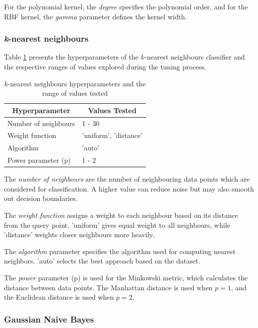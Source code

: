 For the polynomial kernel, the \textit{degree} specifies the polynomial order, and for the RBF kernel, the \textit{gamma} parameter defines the kernel width.

\subsubsection{\textit{k}-nearest neighbours}
Table \ref{tab:knn_params} presents the hyperparameters of the $k$-nearest neighbours classifier and the respective ranges of values explored during the tuning process.

\begin{table}[h]
	\centering
	\begin{tabular}{ll}
		\toprule
		\multicolumn{1}{c}{\textbf{Hyperparameter}} & \multicolumn{1}{c}{\textbf{Values Tested}} \\
		\midrule
		Number of neighbours			   & 1 - 30 \\
		Weight function			           & 'uniform', 'distance' \\
		Algorithm                          & 'auto' \\
		Power parameter (p)                & 1 - 2 \\
		\bottomrule
	\end{tabular}
	\caption{$k$-nearest neighbours hyperparameters and the range of values tested}
	\label{tab:knn_params}
\end{table}

The \textit{number of neighbours} are the number of neighbouring data points which are considered for classification. A higher value can reduce noise but may also smooth out decision boundaries.

The \textit{weight function} assigns a weight to each neighbour based on its distance from the query point. 'uniform' gives equal weight to all neighbours, while 'distance' weights closer neighbours more heavily.

The \textit{algorithm} parameter specifies the algorithm used for computing nearest neighbors. 'auto' selects the best approach based on the dataset.

The \textit{power} parameter (p) is used for the Minkowski metric, which calculates the distance between data points. The Manhattan distance is used when $p=1$, and the Euclidean distance is used when $p=2$.

\subsubsection{Gaussian Naive Bayes}


